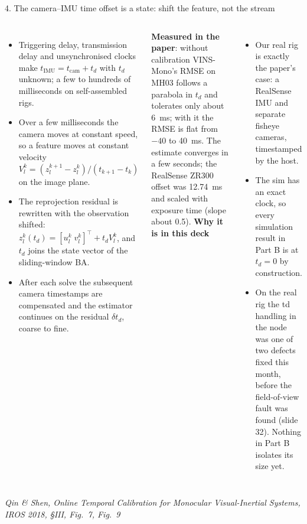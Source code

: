 \documentclass[11pt,aspectratio=169]{beamer}
\newcommand{\src}[1]{\vfill{\tiny\color{black!55}#1}}
\newcommand{\paper}[1]{\textit{#1}}
\begin{document}
\begin{frame}{4. The camera--IMU time offset is a state: shift the feature, not the stream}
  \begin{columns}[T]
      \scriptsize
      \begin{itemize}
        \item Triggering delay, transmission delay and unsynchronised clocks
              make $t_{\mathrm{IMU}} = t_{\mathrm{cam}} + t_d$ with $t_d$
              unknown; a few to hundreds of milliseconds on self-assembled
              rigs.
        \item Over a few milliseconds the camera moves at constant speed, so
              a feature moves at constant velocity
              $V_l^k = (z_l^{k+1}-z_l^k)/(t_{k+1}-t_k)$ on the image plane.
        \item The reprojection residual is rewritten with the observation
              shifted: $z_l^k(t_d) = [u_l^k\;v_l^k]^\top + t_d V_l^k$, and
              $t_d$ joins the state vector of the sliding-window BA.
        \item After each solve the subsequent camera timestamps are
              compensated and the estimator continues on the residual
              $\delta t_d$, coarse to fine.
      \end{itemize}
      \textbf{Measured in the paper}: without calibration VINS-Mono's RMSE on
      MH03 follows a parabola in $t_d$ and tolerates only about
      \SI{6}{\milli\second}; with it the RMSE is flat from $-40$ to
      \SI{+40}{\milli\second}. The estimate converges in a few seconds; the
      RealSense ZR300 offset was \SI{12.74}{\milli\second} and scaled with
      exposure time (slope about 0.5).
      \scriptsize
      \textbf{Why it is in this deck}
      \begin{itemize}
        \item Our real rig is exactly the paper's case: a RealSense IMU and
              separate fisheye cameras, timestamped by the host.
        \item The sim has an exact clock, so every simulation result in Part B
              is at $t_d=0$ by construction.
        \item On the real rig the td handling in the node was one of two
              defects fixed this month, before the field-of-view fault was
              found (slide 32). Nothing in Part B isolates its size yet.
      \end{itemize}
      \vspace{0.6em}
  \end{columns}
  \src{\paper{Qin \& Shen, Online Temporal Calibration for Monocular Visual-Inertial Systems, IROS 2018, §III, Fig.~7, Fig.~9}}
\end{frame}
\end{document}
